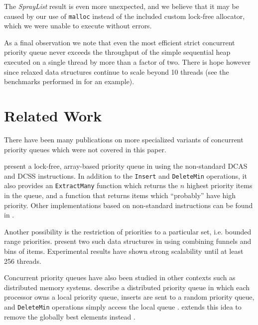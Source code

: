 The \textit{SprayList} result is even more unexpected, and we believe that it may be caused by
our use of \lstinline|malloc| instead of the included custom lock-free allocator, which we were
unable to execute without errors.

As a final observation we note that even the most efficient strict concurrent priority queue
never exceeds the throughput of the simple sequential heap executed on a single thread by more
than a factor of two. There is hope however since relaxed data structures continue to scale
beyond 10 threads (see the benchmarks performed in \cite{alistarhspraylist} for an example).

\section{Related Work} \label{sec:related}

There have been many publications on more specialized variants of concurrent priority queues
which were not covered in this paper.


\citeauthor{liu2012lock} present a lock-free, array-based priority queue in \cite{liu2012lock}
using the non-standard \ac{DCAS} and \ac{DCSS} instructions. In addition to the
\lstinline|Insert| and \lstinline|DeleteMin| operations, it also provides an \lstinline|ExtractMany|
function which returns the $n$ highest priority items in the queue, and a function that returns
items which ``probably'' have high priority. Other implementations based on non-standard instructions
can be found in \cite{israeli1993efficient,greenwald1999non}.


Another possibility is the restriction of priorities to a particular set, i.e. bounded range priorities.
\citeauthor{shavit1999scalable} present two such data structures in \cite{shavit1999scalable} using
combining funnels and bins of items. Experimental results have shown strong scalability until at least
256 threads.


Concurrent priority queues have also been studied in other contexts such as distributed memory systems.
\citeauthor{karp1993randomized} describe a distributed priority queue in which each processor owns
a local priority queue, inserts are sent to a random priority queue, and \lstinline|DeleteMin| operations
simply access the local queue \cite{karp1993randomized}.
\citeauthor{sanders1998randomized} extends this idea to remove the globally best elements instead
\cite{sanders1998randomized}.

